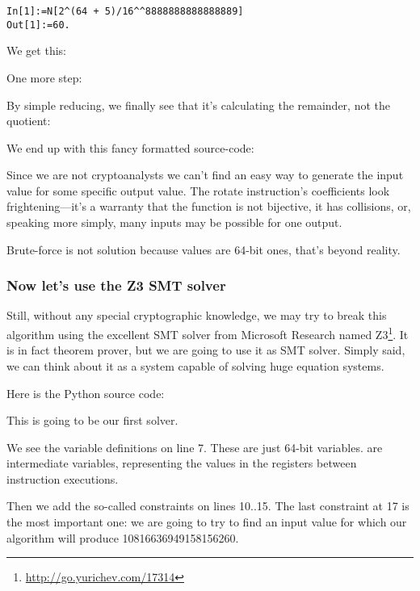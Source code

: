 \begin{lstlisting}[caption=Wolfram Mathematica]
In[1]:=N[2^(64 + 5)/16^^8888888888888889]
Out[1]:=60.
\end{lstlisting}

We get this:



One more step:



By simple reducing, we finally see that it's calculating the remainder, not the quotient:



We end up with this fancy formatted source-code:



Since we are not cryptoanalysts we can't find an easy way to generate the input value for some specific output value.
The rotate instruction's coefficients look frightening---it's a warranty that the function is not bijective,
it has collisions, or, speaking more simply, many inputs may be possible for one output.

Brute-force is not solution because values are 64-bit ones, that's beyond reality.

\subsubsection{Now let's use the Z3 \ac{SMT} solver}

Still, without any special cryptographic knowledge, we may try to break this 
algorithm using the excellent \ac{SMT} solver from Microsoft Research named Z3\footnote{\url{http://go.yurichev.com/17314}}.
It is in fact theorem prover, but we are going to use it as \ac{SMT} solver.
Simply said, we can think about it as a system capable of solving huge equation systems.

Here is the Python source code:



This is going to be our first solver.

We see the variable definitions on line 7.
These are just 64-bit variables.
 are intermediate variables, representing the values in the registers between instruction executions.

Then we add the so-called constraints on lines 10..15.
The last constraint at 17 is the most important one: 
we are going to try to find an input value for which our algorithm will produce 10816636949158156260.

